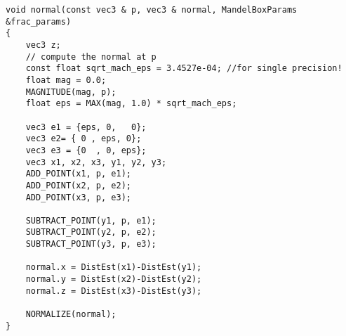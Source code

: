 \documentclass[]{article}
\begin{document}
\begin{Verbatim}[fontsize= \footnotesize, tabsize=4]
void normal(const vec3 & p, vec3 & normal, MandelBoxParams &frac_params)
{
	vec3 z;
	// compute the normal at p
	const float sqrt_mach_eps = 3.4527e-04; //for single precision!
	float mag = 0.0;
	MAGNITUDE(mag, p);
	float eps = MAX(mag, 1.0) * sqrt_mach_eps;

	vec3 e1 = {eps, 0,   0};
	vec3 e2= { 0 , eps, 0};
	vec3 e3 = {0  , 0, eps};
	vec3 x1, x2, x3, y1, y2, y3;
	ADD_POINT(x1, p, e1);
	ADD_POINT(x2, p, e2);
	ADD_POINT(x3, p, e3);

	SUBTRACT_POINT(y1, p, e1);
	SUBTRACT_POINT(y2, p, e2);
	SUBTRACT_POINT(y3, p, e3);

	normal.x = DistEst(x1)-DistEst(y1);
	normal.y = DistEst(x2)-DistEst(y2);
	normal.z = DistEst(x3)-DistEst(y3);

	NORMALIZE(normal);
}

\end{Verbatim}
\end{document}

